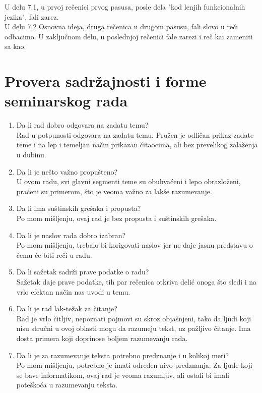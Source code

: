 \documentclass[a4paper]{report}
\begin{document}
U delu 7.1, u prvoj rečenici prvog pasusa, posle dela "kod lenjih funkcionalnih jezika", fali zarez. \\
U delu 7.2 Osnovna ideja, druga rečenica u drugom pasusu, fali slovo u reči odbacimo.
U zaključnom delu, u poslednjoj rečenici fale zarezi i reč kai zameniti sa kao. \\

\section{Provera sadržajnosti i forme seminarskog rada}

\begin{enumerate}
\item Da li rad dobro odgovara na zadatu temu?\\
Rad u potpunosti odgovara na zadatu temu. Pružen je odličan prikaz zadate teme i na lep i temeljan način prikazan čitaocima, ali bez prevelikog zalaženja u dubinu.
\item Da li je nešto važno propušteno?\\
U ovom radu, svi glavni segmenti teme su obuhvaćeni i lepo obrazloženi, praćeni su primerom, što je veoma važno za lakše razumevanje.
\item Da li ima suštinskih grešaka i propusta?\\
Po mom mišljenju, ovaj rad je bez propusta i suštinskih grešaka.
\item Da li je naslov rada dobro izabran?\\
Po mom mišljenju, trebalo bi korigovati naslov jer ne daje jasnu predstavu o čemu će biti reči u radu. 
\item Da li sažetak sadrži prave podatke o radu?\\
Sažetak daje prave podatke, tih par rečenica otkriva delić onoga što sledi  i na vrlo efektan način nas uvodi u temu. 
\item Da li je rad lak-težak za čitanje?\\
Rad je vrlo čitljiv, nepoznati pojmovi su skroz objašnjeni, tako da ljudi koji nisu stručni u ovoj oblasti mogu da razumeju tekst, uz pažljivo čitanje. Ima dosta primera koji doprinose boljem razumevanju rada.
\item Da li je za razumevanje teksta potrebno predznanje i u kolikoj meri?\\
Po mom mišljenju, potrebno je imati određen nivo predznanja. Za ljude koji se bave informatikom, ovaj rad je veoma razumljiv, ali ostali bi imali poteškoća u razumevanju teksta.

\end{enumerate}
\end{document}

